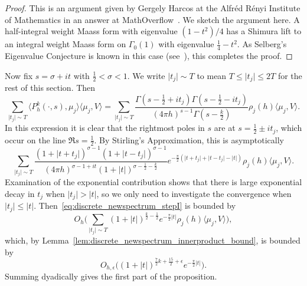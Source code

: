 \begin{proof}
  This is an argument given by Gergely Harcos at the Alfr\'ed R\'enyi Institute of
  Mathematics in an answer at MathOverflow~\cite{GHfromMO}.
  We sketch the argument here.
  A half-integral weight Maass form with eigenvalue $(1 - t^2)/4$ has a Shimura lift to an
  integral weight Maass form on $\Gamma_0(1)$ with eigenvalue $\frac{1}{4} - t^2$.
  As Selberg's Eigenvalue Conjecture is known in this case (see~\cite{Blomer2013}), this
  completes the proof.
\end{proof}


Now fix $s = \sigma + it$ with $\frac{1}{2} < \sigma < 1$.
We write $\lvert t_j \rvert \sim T$ to mean $T \leq \lvert t_j \rvert \leq 2T$ for the
rest of this section.
Then
\begin{equation}
  \sum_{\lvert t_j \rvert \sim T} \langle P_h^k(\cdot, s), \mu_j \rangle \langle \mu_j, V
  \rangle = \sum_{\lvert t_j \rvert \sim T} \frac{\Gamma(s - \frac{1}{2} + it_j) \Gamma(s
- \frac{1}{2} - it_j)}{(4\pi h)^{s - 1} \Gamma(s - \frac{k}{2})} \rho_j(h) \langle \mu_j,
V \rangle.
\end{equation}
In this expression it is clear that the rightmost poles in $s$ are at $s = \frac{1}{2} \pm
it_j$, which occur on the line $\Re s = \frac{1}{2}$.
By Stirling's Approximation, this is asymptotically
\begin{equation}\label{eq:discrete_newspectrum_stepI}
  \sum_{\lvert t_j \rvert \sim T} \frac{(1 + \lvert t + t_j \rvert)^{\sigma - 1} (1 +
  \lvert t - t_j \rvert)^{\sigma - 1}}{(4\pi h)^{\sigma - 1 + it}(1 + \lvert t
\rvert)^{\sigma - \frac{1}{2} - \frac{k}{2}}} e^{-\frac{\pi}{2}(\lvert t + t_j \rvert +
\lvert t-t_j \rvert - \lvert t \rvert)} \rho_j(h) \langle \mu_j, V \rangle.
\end{equation}
Examination of the exponential contribution shows that there is large exponential decay in
$t_j$ when $\lvert t_j \rvert > \lvert t \rvert$, so we only need to investigate the
convergence when $\lvert t_j \rvert \leq \lvert t \rvert$.
Then~\eqref{eq:discrete_newspectrum_stepI} is bounded by
\begin{equation}
  O_h\Big( \sum_{\lvert t_j \rvert \sim T} (1 + \lvert t \rvert)^{\frac{k}{2} -
  \frac{1}{2}} e^{-\frac{\pi}{2} \lvert t \rvert} \rho_j(h) \langle \mu_j, V \rangle
\Big),
\end{equation}
which, by Lemma~\ref{lem:discrete_newspectrum_innerproduct_bound}, is bounded by
\begin{equation}
  O_{h, \epsilon} \Big( (1 + \lvert t \rvert)^{\frac{7}{2}k + \frac{15}{2} + \epsilon}
  e^{-\frac{\pi}{2}\lvert t \rvert}\Big).
\end{equation}
Summing dyadically gives the first part of the proposition.


